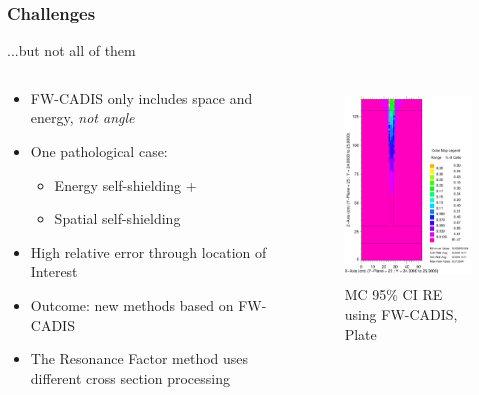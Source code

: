 \documentclass[xcolor=x11names,compress]{beamer}
\renewcommand{\(}{\begin{columns}}
\renewcommand{\)}{\end{columns}}
\newcommand{\<}[1]{\begin{column}{#1}}
\renewcommand{\>}{\end{column}}
\begin{document}
\begin{frame}[fragile]
  \frametitle{Challenges}

	...but not all of them
	\begin{columns}
  	\begin{column}{0.5\textwidth}
  	\begin{center}
		\begin{itemize}
		\item FW-CADIS only includes space and energy, 
			\textit{not angle}
		\item One pathological case:
		\begin{itemize}
		\item Energy self-shielding +
		\item Spatial self-shielding
		\end{itemize}
		\item High relative error through location of Interest
		\item Outcome: new methods based on FW-CADIS
		\item The Resonance Factor method uses different cross section processing
		\end{itemize}
	\end{center}
  	\end{column}
 	\begin{column}{0.5\textwidth}
  	\begin{center}
  	\begin{figure}
  		\includegraphics[height=2in,clip]{plate-badVR}
  		\caption{MC 95\% CI RE using FW-CADIS, Plate}
  	\end{figure}
  	\end{center}
  	\end{column}
	\end{columns}
  
\end{frame}


\end{document}
